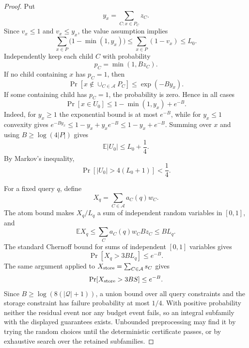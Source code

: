 \documentclass[10pt]{article}
\theoremstyle{definition}
\newcommand{\E}{\mathbb{E}}
\begin{document}
\begin{proof}
   Put
   \[
      y_x=\sum_{C:x\in P_C}z_C .
   \]
   Since $v_x\le1$ and $v_x\le y_x$, the value assumption implies
   \[
      \sum_{x\in P}\bigl(1-\min(1,y_x)\bigr)
      \le
      \sum_{x\in P}(1-v_x)
      \le L_0 .
   \]
   Independently keep each child $C$ with probability
   \[
      p_C=\min(1,Bz_C).
   \]
   If no child containing $x$ has $p_C=1$, then
   \[
      \Pr[x\notin\cup_{C\in\mathcal A}P_C]
      \le
      \exp(-B y_x).
   \]
   If some containing child has $p_C=1$, the probability is zero.  Hence in all
   cases
   \[
      \Pr[x\in U_0]
      \le
      1-\min(1,y_x)+e^{-B}.
   \]
   Indeed, for $y_x\ge1$ the exponential bound is at most $e^{-B}$, while for
   $y_x\le1$ convexity gives
   $e^{-B y_x}\le 1-y_x+y_xe^{-B}\le1-y_x+e^{-B}$.
   Summing over $x$ and using $B\ge\log(4|P|)$ gives
   \[
      \E |U_0|\le L_0+\frac14 .
   \]
   By Markov's inequality,
   \[
      \Pr[|U_0|>4(L_0+1)]<\frac14 .
   \]

   For a fixed query $q$, define
   \[
      X_q=\sum_{C\in\mathcal A}a_C(q)w_C .
   \]
   The atom bound makes $X_q/L_q$ a sum of independent random variables in
   $[0,1]$, and
   \[
      \E X_q\le
      \sum_C a_C(q)w_C Bz_C
      \le B L_q .
   \]
   The standard Chernoff bound for sums of independent $[0,1]$ variables gives
   \[
      \Pr[X_q>3B L_q]\le e^{-B}.
   \]
   The same argument applied to
   $X_{\rm store}=\sum_{C\in\mathcal A}s_C$ gives
   \[
      \Pr[X_{\rm store}>3B S]\le e^{-B}.
   \]
   Since $B\ge\log(8(|\mathcal Q|+1))$, a union bound over all query constraints
   and the storage constraint has failure probability at most $1/4$.  With
   positive probability neither the residual event nor any budget event fails,
   so an integral subfamily with the displayed guarantees exists.  Unbounded
   preprocessing may find it by trying the random choices until the deterministic
   certificate passes, or by exhaustive search over the retained subfamilies.
\end{proof}
\end{document}
